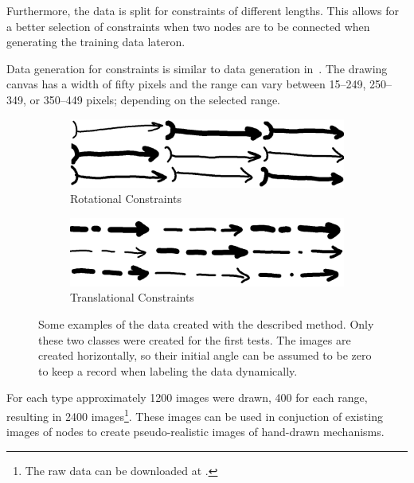 Furthermore, the data is split for constraints of different lengths.
This allows for a better selection of constraints when two nodes are to be connected when generating the training data lateron.

Data generation for constraints is similar to data generation in~\cite{Lawrence2020}.
The drawing canvas has a width of fifty pixels and the range can vary between 15--249, 250--349, or 350--449 pixels; depending on the selected range.

\begin{figure}
    \centering
    \begin{subfigure}[b]{0.45\textwidth}
        \includegraphics[width=\textwidth]{images/rs.png}
        \caption{Rotational Constraints}\label{fig:rotational_constraints}
    \end{subfigure}
    \begin{subfigure}[b]{0.45\textwidth}
        \includegraphics[width=\textwidth]{images/ts.png}
        \caption{Translational Constraints}\label{fig:translational_constraints}
    \end{subfigure}
    \caption[Examples of constraint detector training data]{Some examples of the data created with the described method. Only these two classes were created for the first tests. The images are created horizontally, so their initial angle can be assumed to be zero to keep a record when labeling the data dynamically. }\label{fig:constraint_data}
\end{figure}

For each type approximately 1200 images were drawn, 400 for each range, resulting in 2400 images\footnote{The raw data can be downloaded at .}.
These images can be used in conjuction of existing images of nodes to create pseudo-realistic images of hand-drawn mechanisms.

